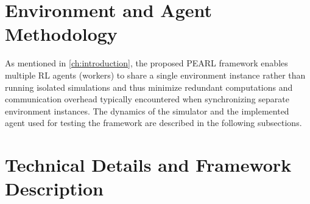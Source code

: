 

\section{Environment and Agent Methodology}
\label{sec:methodology}

As mentioned in \autoref{ch:introduction}, the proposed PEARL framework enables multiple RL agents (workers)
to share a single environment instance rather than running isolated simulations and thus
minimize redundant computations and communication overhead typically
encountered when synchronizing separate environment instances.
The dynamics of the simulator and the implemented agent used for testing the framework are described in the following subsections.




\section{Technical Details and Framework Description}
\label{sec:technical_details}



